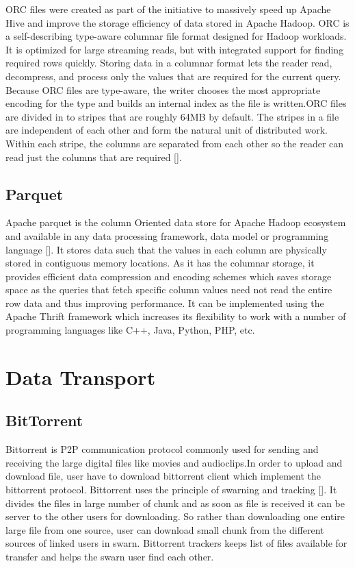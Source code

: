 ORC files were created as part of the initiative to massively speed up
Apache Hive and improve the storage efficiency of data stored in
Apache Hadoop. ORC is a self-describing type-aware columnar file
format designed for Hadoop workloads. It is optimized for large
streaming reads, but with integrated support for finding required rows
quickly. Storing data in a columnar format lets the reader read,
decompress, and process only the values that are required for the
current query. Because ORC files are type-aware, the writer chooses
the most appropriate encoding for the type and builds an internal
index as the file is written.ORC files are divided in to stripes that
are roughly 64MB by default. The stripes in a file are independent of
each other and form the natural unit of distributed work. Within each
stripe, the columns are separated from each other so the reader can
read just the columns that are required [\cite{www-orc-docs}].

     
\subsection{Parquet}

Apache parquet is the column Oriented data store for Apache Hadoop
ecosystem and available in any data processing framework, data model
or programming language [\cite{www-parquet}]. It stores data such that
the values in each column are physically stored in contiguous memory
locations. As it has the columnar storage, it provides efficient data
compression and encoding schemes which saves storage space as the
queries that fetch specific column values need not read the entire row
data and thus improving performance. It can be implemented using the
Apache Thrift framework which increases its flexibility to work with a
number of programming languages like C++, Java, Python, PHP, etc.
     
\section{Data Transport}
\label{S:o-data-transport}

\subsection{BitTorrent}

Bittorrent is P2P communication protocol commonly used for sending and
receiving the large digital files like movies and audioclips.In order
to upload and download file, user have to download bittorrent client
which implement the bittorrent protocol. Bittorrent uses the principle
of swarning and tracking [\cite{www-bittorrent}]. It divides the files
in large number of chunk and as soon as file is received it can be
server to the other users for downloading.  So rather than downloading
one entire large file from one source, user can download small chunk
from the different sources of linked users in swarn. Bittorrent
trackers keeps list of files available for transfer and helps the
swarn user find each other.

